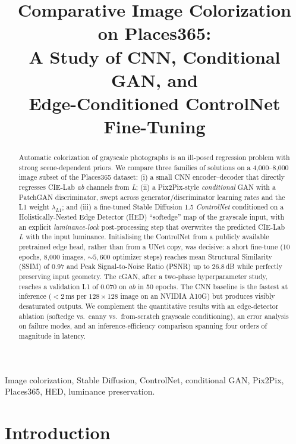 \documentclass[conference]{IEEEtran}
\title{Comparative Image Colorization on Places365:\\
       A Study of CNN, Conditional GAN, and\\
       Edge-Conditioned ControlNet Fine-Tuning}
\author{\IEEEauthorblockN{Author}
\IEEEauthorblockA{Department of Computer Science\\
Course Project, 2026}}
\begin{document}
\maketitle

\begin{abstract}
Automatic colorization of grayscale photographs is an ill-posed
regression problem with strong scene-dependent priors. We compare three
families of solutions on a 4{,}000--8{,}000 image subset of the
Places365 dataset: (i) a small CNN encoder--decoder that directly
regresses CIE-Lab \emph{ab} channels from \emph{L}; (ii) a Pix2Pix-style
\emph{conditional} GAN with a PatchGAN discriminator, swept across
generator/discriminator learning rates and the L1 weight $\lambda_{L1}$;
and (iii) a fine-tuned Stable Diffusion 1.5 \emph{ControlNet} conditioned
on a Holistically-Nested Edge Detector (HED) ``softedge'' map of the
grayscale input, with an explicit \emph{luminance-lock} post-processing
step that overwrites the predicted CIE-Lab \emph{L} with the input
luminance. Initialising the ControlNet from a publicly available
pretrained edge head, rather than from a UNet copy, was decisive: a
short fine-tune (10 epochs, 8{,}000 images, ${\sim}5{,}600$ optimizer
steps) reaches mean Structural Similarity (SSIM) of $0.97$ and Peak
Signal-to-Noise Ratio (PSNR) up to $26.8$\,dB while perfectly preserving
input geometry. The cGAN, after a two-phase hyperparameter study, reaches a
validation L1 of $0.070$ on $ab$ in 50 epochs. The CNN baseline is the
fastest at inference ($<2$\,ms per $128{\times}128$ image on an NVIDIA
A10G) but produces visibly desaturated outputs. We complement the
quantitative results with an edge-detector ablation (softedge vs.\ canny
vs.\ from-scratch grayscale conditioning), an error analysis on failure
modes, and an inference-efficiency comparison spanning four orders of
magnitude in latency.
\end{abstract}

\begin{IEEEkeywords}
Image colorization, Stable Diffusion, ControlNet, conditional GAN,
Pix2Pix, Places365, HED, luminance preservation.
\end{IEEEkeywords}

\section{Introduction}\label{sec:intro}
\end{document}
